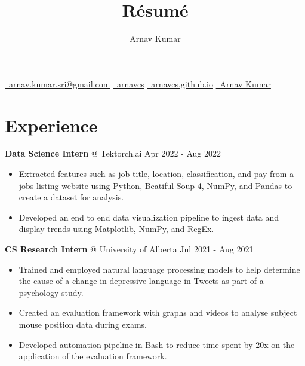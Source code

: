 \documentclass{article}
\makeatletter
\newcommand{\smallbullet}{\,\begin{picture}(-1,1)(-1,-3)\circle*{3}\end{picture}\ }
\renewcommand{\maketitle}{
    \begin{center}
    {\color{MyBlue3}\Huge\bfseries
        \theauthor
    }

    \vspace{0.3em}
    {
        \href{mailto:arnav.kumar.sri@gmail.com}{\faEnvelope \ arnav.kumar.sri@gmail.com} \quad
        \href{https://github.com/arnavcs}{\faGithub \ arnavcs} \quad
        \href{https://arnavcs.github.io/}{\faGlobe \ arnavcs.github.io} \quad
        \href{https://www.linkedin.com/in/arnav-kumar-0644881a3/}{\faLinkedin \ Arnav Kumar}
    }
    \vspace{-1em}
    \end{center}
}
\newenvironment{resumeItem}
{
    \vspace{0.5em}
}
{
}
\newcommand{\experienceHead}[4]{
    \textbf{#1} @ #2 \hfill #3 \\[-1.2em]
}
\newenvironment{resumeList}
{
    \begin{itemize}[label=\smallbullet]
}
{
    \end{itemize}
}
\makeatother
\begin{document}
\title{R\'esum\'e}
\author{Arnav Kumar}

\maketitle


\section{Experience}

\begin{resumeItem}
\experienceHead{Data Science Intern}{Tektorch.ai}{Apr 2022 - Aug 2022}{Online}
\begin{resumeList}
    \item Extracted features such as job title, location, classification, and pay from a jobs listing website using Python, Beatiful Soup 4, NumPy, and Pandas to create a dataset for analysis. 
    \item Developed an end to end data visualization pipeline to ingest data and display trends using Matplotlib, NumPy, and RegEx.
\end{resumeList}
\end{resumeItem}


\begin{resumeItem}
\experienceHead{CS Research Intern}{University of Alberta}{Jul 2021 - Aug 2021}{Online}
\begin{resumeList}
    \item Trained and employed natural language processing models to help determine the cause of a change in depressive language in Tweets as part of a psychology study.
    \item Created an evaluation framework with graphs and videos to analyse subject mouse position data during exams.
    \item Developed automation pipeline in Bash to reduce time spent by 20x on the application of the evaluation framework.
\end{resumeList}
\end{resumeItem}
\end{document}
